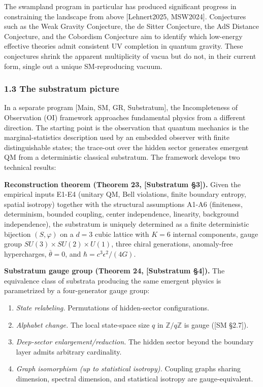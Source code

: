 \documentclass[
]{article}
\providecommand{\tightlist}{%
  \setlength{\itemsep}{0pt}\setlength{\parskip}{0pt}}
\begin{document}
The swampland program in particular has produced significant progress in
constraining the landscape from above {[}Lehnert2025, MSW2024{]}.
Conjectures such as the Weak Gravity Conjecture, the de Sitter
Conjecture, the AdS Distance Conjecture, and the Cobordism Conjecture
aim to identify which low-energy effective theories admit consistent UV
completion in quantum gravity. These conjectures shrink the apparent
multiplicity of vacua but do not, in their current form, single out a
unique SM-reproducing vacuum.

\hypertarget{the-substratum-picture}{%
\subsubsection{1.3 The substratum
picture}\label{the-substratum-picture}}

In a separate program {[}Main, SM, GR, Substratum{]}, the Incompleteness
of Observation (OI) framework approaches fundamental physics from a
different direction. The starting point is the observation that quantum
mechanics is the marginal-statistics description used by an embedded
observer with finite distinguishable states; the trace-out over the
hidden sector generates emergent QM from a deterministic classical
substratum. The framework develops two technical results:

\textbf{Reconstruction theorem (Theorem 23, {[}Substratum §3{]}).} Given
the empirical inputs E1-E4 (unitary QM, Bell violations, finite boundary
entropy, spatial isotropy) together with the structural assumptions
A1-A6 (finiteness, determinism, bounded coupling, center independence,
linearity, background independence), the substratum is uniquely
determined as a finite deterministic bijection \((S, \varphi)\) on a
\(d=3\) cubic lattice with \(K = 6\) internal components, gauge group
\(SU(3) \times SU(2) \times U(1)\), three chiral generations,
anomaly-free hypercharges, \(\bar\theta = 0\), and
\(\hbar = c^3 \epsilon^2/(4G)\).

\textbf{Substratum gauge group (Theorem 24, {[}Substratum §4{]}).} The
equivalence class of substrata producing the same emergent physics is
parametrized by a four-generator gauge group:

\begin{enumerate}
\def\labelenumi{(\roman{enumi})}
\tightlist
\item
  \emph{State relabeling.} Permutations of hidden-sector configurations.
\item
  \emph{Alphabet change.} The local state-space size \(q\) in
  \(\mathbb{Z}/q\mathbb{Z}\) is gauge ({[}SM §2.7{]}).
\item
  \emph{Deep-sector enlargement/reduction.} The hidden sector beyond the
  boundary layer admits arbitrary cardinality.
\item
  \emph{Graph isomorphism (up to statistical isotropy).} Coupling graphs
  sharing dimension, spectral dimension, and statistical isotropy are
  gauge-equivalent.
\end{enumerate}
\end{document}
